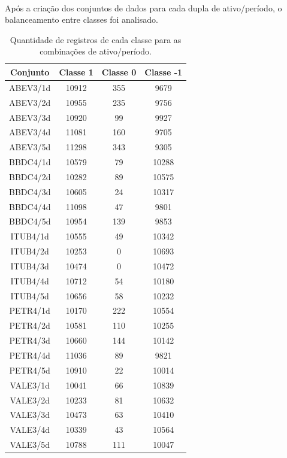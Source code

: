 \documentclass[grad,numbers]{coppe}
\begin{document}
  		\paragraph{}Após a criação dos conjuntos de dados para cada dupla de ativo/período, o balanceamento entre classes foi analisado.
  		\begin{table}[h]
  			\caption{Quantidade de registros de cada classe para as combinações de ativo/período.}
  			\label{tab:table-class-balancing}
  			\centering
  			{\footnotesize
  				\begin{tabular}{|c|c|c|c|}
  					\hline
						Conjunto & Classe 1 & Classe 0 & Classe -1 \\
						\hline
						ABEV3/1d & 10912 & 355 & 9679 \\
						ABEV3/2d & 10955 & 235 & 9756 \\
						ABEV3/3d & 10920 & 99 & 9927 \\
						ABEV3/4d & 11081 & 160 & 9705 \\
						ABEV3/5d & 11298 & 343 & 9305 \\
						BBDC4/1d & 10579 & 79 & 10288 \\
						BBDC4/2d & 10282 & 89 & 10575 \\
						BBDC4/3d & 10605 & 24 & 10317 \\
						BBDC4/4d & 11098 & 47 & 9801 \\
						BBDC4/5d & 10954 & 139 & 9853 \\
						ITUB4/1d & 10555 & 49 & 10342 \\
						ITUB4/2d & 10253 & 0 & 10693 \\
						ITUB4/3d & 10474 & 0 & 10472 \\
						ITUB4/4d & 10712 & 54 & 10180 \\
						ITUB4/5d & 10656 & 58 & 10232 \\
						PETR4/1d & 10170 & 222 & 10554 \\
						PETR4/2d & 10581 & 110 & 10255 \\
						PETR4/3d & 10660 & 144 & 10142 \\
						PETR4/4d & 11036 & 89 & 9821 \\
						PETR4/5d & 10910 & 22 & 10014 \\
						VALE3/1d & 10041 & 66 & 10839 \\
						VALE3/2d & 10233 & 81 & 10632 \\
						VALE3/3d & 10473 & 63 & 10410 \\
						VALE3/4d & 10339 & 43 & 10564 \\
						VALE3/5d & 10788 & 111 & 10047 \\
  					\hline
  			\end{tabular}}
  		\end{table}
\end{document}
